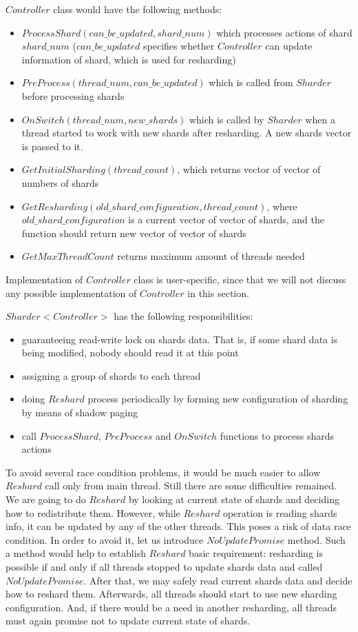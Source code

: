 \documentclass{article}
\begin{document}
$Controller$ class would have the following methods:
\begin{itemize}
	\item $ProcessShard(can\_be\_updated, shard\_num)$ which processes actions of shard $shard\_num$ ($can\_be\_updated$ specifies whether $Controller$ can update information of shard, which is used for resharding)
	\item $PreProcess(thread\_num, can\_be\_updated)$ which is called from $Sharder$ before processing shards
	\item $OnSwitch(thread\_num, new\_shards)$ which is called by $Sharder$ when a thread started to work with new shards after resharding. A new shards vector is passed to it.
	\item $GetInitialSharding(thread\_count)$, which returns vector of vector of numbers of shards
	\item $GetResharding(old\_shard\_configuration, thread\_count)$, where $old\_shard\_configuration$ is a current vector of vector of shards, and the function should return new vector of vector of shards
	\item $GetMaxThreadCount$ returns maximum amount of threads needed
\end{itemize}

Implementation of $Controller$ class is user-specific, since that we will not discuss any possible implementation of $Controller$ in this section.

$Sharder<Controller>$ has the following responsibilities:
\begin{itemize}
	\item guaranteeing read-write lock on shards data. That is, if some shard data is being modified, nobody should read it at this point
	\item assigning a group of shards to each thread
	\item doing $Reshard$ process periodically by forming new configuration of sharding by means of shadow paging
	\item call $ProcessShard$, $PreProcess$ and $OnSwitch$ functions to process shards actions
\end{itemize}

To avoid several race condition problems, it would be much easier to allow $Reshard$ call only from main thread. Still there are some difficulties remained. We are going to do $Reshard$ by looking at current state of shards and deciding how to redistribute them. However, while $Reshard$ operation is reading shards info, it can be updated by any of the other threads. This poses a risk of data race condition. In order to avoid it, let us introduce $NoUpdatePromise$ method. Such a method would help to establish $Reshard$ basic requirement: resharding is possible if and only if all threads stopped to update shards data and called $NoUpdatePromise$. After that, we may safely read current shards data and decide how to reshard them. Afterwards, all threads should start to use new sharding configuration. And, if there would be a need in another resharding, all threads must again promise not to update current state of shards.
\end{document}
